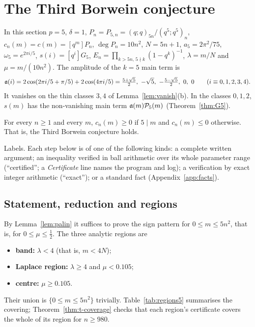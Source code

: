 \section{The Third Borwein conjecture}\label{sec:third}

In this section $p=5$, $\delta=1$, $P_n=P_{5,n}=(q;q)_{5n}/(q^5;q^5)_n$, $c_n(m)=c(m)=[q^m]P_n$, $\deg P_n=10n^2$,
$N=5n+1$, $a_5=2\pi^2/75$, $\omega_5=e^{2\pi i/5}$, $s(i)=[q^i]G_5$, $E_n=\prod_{k>5n,\,5\nmid k}(1-q^k)^{-1}$, $\lambda=m/N$
and $\mu=m/(10n^2)$. The amplitude of the $k=5$ main term is
\[
\fa(i)=2\cos(2\pi i/5+\pi/5)+2\cos(4\pi i/5)=\tfrac{5+\sqrt5}2,\ -\sqrt5,\ -\tfrac{5-\sqrt5}2,\ 0,\ 0\qquad(i\equiv0,1,2,3,4).
\]
It vanishes on the thin classes $3,4$ of Lemma~\ref{lem:vanish}(b). In the classes $0,1,2$, $s(m)$ has the non-vanishing
main term $\mathfrak a(m)\mathcal P_5(m)$ (Theorem~\ref{thm:G5}).

\begin{theorem}\label{thm:third-main}
For every $n\ge1$ and every $m$, $c_n(m)\ge0$ if $5\mid m$ and $c_n(m)\le0$ otherwise. That is, the Third Borwein
conjecture holds.
\end{theorem}

Labels. Each step below is of one of the following kinds: a complete written argument; an inequality verified in ball
arithmetic over its whole parameter range (``certified''; a \emph{Certificate} line names the program and log); a
verification by exact integer arithmetic (``exact''); or a standard fact (Appendix~\ref{app:facts}).

\subsection{Statement, reduction and regions}\label{sec:t-reduction}

By Lemma~\ref{lem:palin} it suffices to prove the sign pattern for $0\le m\le5n^2$, that is, for $0\le\mu\le\frac12$. The
three analytic regions are
\begin{itemize}
\item \textbf{band:} $\lambda<4$ (that is, $m<4N$);
\item \textbf{Laplace region:} $\lambda\ge4$ and $\mu<0.105$;
\item \textbf{centre:} $\mu\ge0.105$.
\end{itemize}
Their union is $\{0\le m\le5n^2\}$ trivially. Table~\ref{tab:regions5} summarises the covering;
Theorem~\ref{thm:t-coverage} checks that each region's certificate covers the whole of its region for $n\ge980$.


